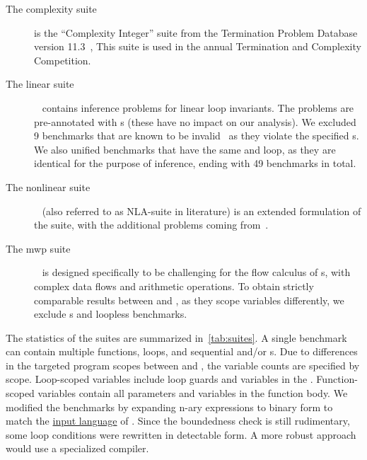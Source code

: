 \begin{description}

\item[The {complexity} suite] is the \enquote{Complexity  Integer} suite
from the Termination Problem Database version 11.3~\cite{tpdb}, This suite is
used in the annual Termination and Complexity Competition.

\item[The linear suite]~\cite{si2018} contains inference problems for linear
loop invariants. The problems are
pre-annotated with s (these have no impact
on our analysis). We excluded 9 benchmarks that are known to be
invalid~\cite[Appendix G]{ryan2020} as they violate the specified
s. We also unified benchmarks that have the
same  and loop, as they are identical for the purpose of
\emph{} inference, ending with 49 benchmarks in total.

\item[The nonlinear suite]~\cite{nguyen2017} (also
referred to as NLA-suite in literature) is an extended formulation of the suite,
with the additional problems coming from~\cite{yu2023}.

\item[The {mwp} suite]~\cite{aubert2023b} is designed specifically to be
challenging for the flow calculus of s, with
complex data flows and arithmetic operations. To obtain strictly comparable
results between \ndx{\impl} and \ndx{\impf}, as they scope variables
differently, we exclude s and loopless benchmarks.

\end{description}

The statistics of the suites are summarized in~\autoref{tab:suites}. A single
benchmark can contain multiple functions, loops, and sequential and/or
s. Due to differences in the targeted program scopes between
\ndx{\impl} and \ndx{\impf}, the variable counts are specified by scope.
Loop-scoped variables include loop guards and variables in
the . Function-scoped variables contain all parameters and
variables in the function body. We modified the benchmarks by expanding n-ary
expressions to binary form to match the
\href{https://statycc.github.io/pymwp/features/}{input language} of .
Since the boundedness check is still rudimentary, some loop conditions were
rewritten in detectable form. A more robust approach would use a specialized
compiler.
